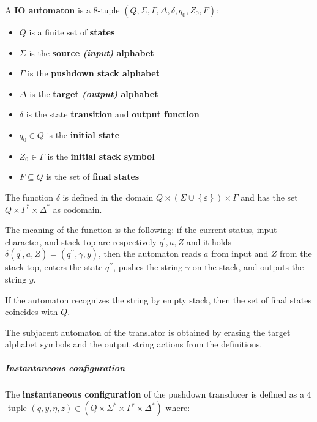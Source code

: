 \documentclass[english]{article}
\begin{document}
\begin{definition}[IO automaton]
  \label{def:pushdown-transducer}
  A \textbf{IO automaton} is  a \(8\)-tuple \(\left( Q, \Sigma, \Gamma, \Delta, \delta, q_0, Z_0, F \right)\):

  \begin{itemize}
    \item \(Q\) is a finite set of \textbf{states}
    \item \(\Sigma\) is the \textbf{source \textit{(input)} alphabet}
    \item \(\Gamma\) is the \textbf{pushdown stack alphabet}
    \item \(\Delta\) is the\textbf{ target \textit{(output)} alphabet}
    \item \(\delta\) is the state \textbf{transition} and \textbf{output function}
    \item \(q_0 \in Q\) is the \textbf{initial state}
    \item \(Z_0 \in \Gamma\) is the \textbf{initial stack symbol}
    \item \(F \subseteq Q\) is the set of \textbf{final states}
  \end{itemize}
\end{definition}

The function \(\delta\) is defined in the domain \(Q \times \left( \Sigma \cup \left\{ \varepsilon \right\} \right) \times \Gamma\) and has the set \(Q \times \Gamma^\ast \times \Delta^\ast\) as codomain.

The meaning of the function is the following: if the current status, input character, and stack top are respectively \(q^\prime, a, Z\) and it holds \(\delta\left(q^\prime, a, Z\right) = \left( q^{\prime\prime}, \gamma, y \right)\), then the automaton reads \(a\) from input and \(Z\) from the stack top, enters the state \(q^{\prime\prime}\), pushes the string \(\gamma\) on the stack, and outputs the string \(y\).

If the automaton recognizes the string by empty stack, then the set of final states coincides with \(Q\).

The subjacent automaton of the translator is obtained by erasing the target alphabet symbols and the output string actions from the definitions.

\subparagraph*{Instantaneous configuration}
The \textbf{instantaneous configuration} of the pushdown transducer is defined as a \(4\)-tuple \(\left( q, y, \eta, z \right) \in \left( Q \times \Sigma^\ast \times \Gamma^\ast \times \Delta^\ast \right)\) where:
\end{document}

